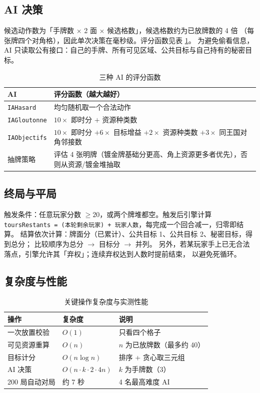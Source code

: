 \documentclass[11pt,a4paper]{ctexart}
\newcommand{\cl}[1]{\texttt{#1}}
\begin{document}
\subsection{AI 决策}
候选动作数为「手牌数 $\times$ 2 面 $\times$ 候选格数」，候选格数约为已放牌数的 4 倍
（每张牌四个对角格），因此单次决策在毫秒级。评分函数见表 \ref{tab:ia}。
为避免偷看信息，AI 只读取公有接口：自己的手牌、所有可见区域、公共目标与自己持有的秘密目标。

\begin{table}[h]
\centering
\small
\begin{tabular}{p{3.2cm}p{9.6cm}}
\toprule
AI & 评分函数（越大越好） \\
\midrule
\cl{IAHasard} & 均匀随机取一个合法动作 \\
\cl{IAGloutonne} & $10 \times$ 即时分 $+$ 资源种类数 \\
\cl{IAObjectifs} & $10 \times$ 即时分 $+ 6 \times$ 目标增益 $+ 2 \times$ 资源种类数 $+ 3 \times$ 同王国对角邻接数 \\
抽牌策略 & 评估 4 张明牌（镀金牌基础分更高、角上资源更多者优先），否则从资源/镀金堆抽取 \\
\bottomrule
\end{tabular}
\caption{三种 AI 的评分函数}
\label{tab:ia}
\end{table}

\subsection{终局与平局}
触发条件：任意玩家分数 $\ge 20$，或两个牌堆都空。触发后引擎计算
\cl{toursRestants = (本轮剩余玩家) + 玩家人数}，每完成一个回合减一，归零即结算。
结算依次计算：牌面分（已累计）、公共目标 1、公共目标 2、秘密目标，得到总分；
比较顺序为总分 $\rightarrow$ 目标分 $\rightarrow$ 并列。
另外，若某玩家手上已无合法落点，引擎允许其「弃权」；连续弃权达到人数时提前结束，
以避免死循环。

\subsection{复杂度与性能}
\begin{table}[h]
\centering
\small
\begin{tabular}{p{4.6cm}p{4.6cm}p{4.2cm}}
\toprule
操作 & 复杂度 & 说明 \\
\midrule
一次放置校验 & $O(1)$ & 只看四个格子 \\
可见资源重算 & $O(n)$ & $n$ 为已放牌数（最多约 40） \\
目标计分 & $O(n \log n)$ & 排序 + 贪心取三元组 \\
AI 决策 & $O(n \cdot k \cdot 2 \cdot 4n)$ & $k$ 为手牌数（3） \\
200 局自动对局 & 约 7 秒 & 4 名最高难度 AI \\
\bottomrule
\end{tabular}
\caption{关键操作复杂度与实测性能}
\label{tab:perf}
\end{table}
\end{document}
